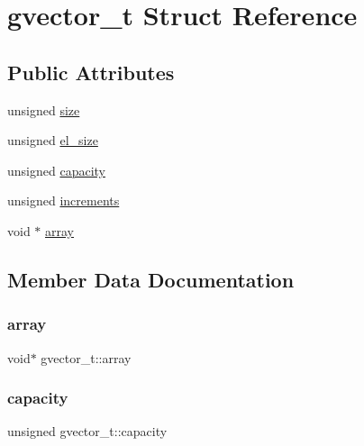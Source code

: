 \hypertarget{structgvector__t}{}\section{gvector\+\_\+t Struct Reference}
\label{structgvector__t}
\subsection*{Public Attributes}
\begin{DoxyCompactItemize}
\item 
unsigned \hyperlink{structgvector__t_a740303b1753b7d95a89c75637c875ca4}{size}
\item 
unsigned \hyperlink{structgvector__t_a535f3426a6ac2dd946d90353674ec8c8}{el\+\_\+size}
\item 
unsigned \hyperlink{structgvector__t_a517503cade4866c47d4de67bb24440d3}{capacity}
\item 
unsigned \hyperlink{structgvector__t_a39ed5cd080d8b5557cd6967c0aae966b}{increments}
\item 
void $\ast$ \hyperlink{structgvector__t_a3bbc50d85feec3c63a31b0ac665fe623}{array}
\end{DoxyCompactItemize}


\subsection{Member Data Documentation}
\hypertarget{structgvector__t_a3bbc50d85feec3c63a31b0ac665fe623}{}\label{structgvector__t_a3bbc50d85feec3c63a31b0ac665fe623} 
\subsubsection{\texorpdfstring{array}{array}}
{\footnotesize\ttfamily void$\ast$ gvector\+\_\+t\+::array}

\hypertarget{structgvector__t_a517503cade4866c47d4de67bb24440d3}{}\label{structgvector__t_a517503cade4866c47d4de67bb24440d3} 
\subsubsection{\texorpdfstring{capacity}{capacity}}
{\footnotesize\ttfamily unsigned gvector\+\_\+t\+::capacity}

